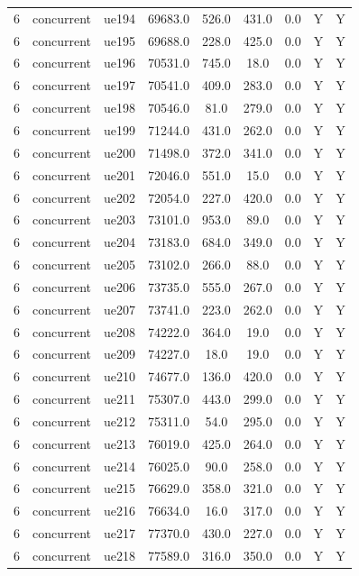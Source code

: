\begin{table}[ht]
\begin{tabular}{|c|c|c|c|c|c|c|c|c|}
6 & concurrent & ue194 & 69683.0 & 526.0 & 431.0 & 0.0 & Y & Y \\
6 & concurrent & ue195 & 69688.0 & 228.0 & 425.0 & 0.0 & Y & Y \\
6 & concurrent & ue196 & 70531.0 & 745.0 & 18.0 & 0.0 & Y & Y \\
6 & concurrent & ue197 & 70541.0 & 409.0 & 283.0 & 0.0 & Y & Y \\
6 & concurrent & ue198 & 70546.0 & 81.0 & 279.0 & 0.0 & Y & Y \\
6 & concurrent & ue199 & 71244.0 & 431.0 & 262.0 & 0.0 & Y & Y \\
6 & concurrent & ue200 & 71498.0 & 372.0 & 341.0 & 0.0 & Y & Y \\
6 & concurrent & ue201 & 72046.0 & 551.0 & 15.0 & 0.0 & Y & Y \\
6 & concurrent & ue202 & 72054.0 & 227.0 & 420.0 & 0.0 & Y & Y \\
6 & concurrent & ue203 & 73101.0 & 953.0 & 89.0 & 0.0 & Y & Y \\
6 & concurrent & ue204 & 73183.0 & 684.0 & 349.0 & 0.0 & Y & Y \\
6 & concurrent & ue205 & 73102.0 & 266.0 & 88.0 & 0.0 & Y & Y \\
6 & concurrent & ue206 & 73735.0 & 555.0 & 267.0 & 0.0 & Y & Y \\
6 & concurrent & ue207 & 73741.0 & 223.0 & 262.0 & 0.0 & Y & Y \\
6 & concurrent & ue208 & 74222.0 & 364.0 & 19.0 & 0.0 & Y & Y \\
6 & concurrent & ue209 & 74227.0 & 18.0 & 19.0 & 0.0 & Y & Y \\
6 & concurrent & ue210 & 74677.0 & 136.0 & 420.0 & 0.0 & Y & Y \\
6 & concurrent & ue211 & 75307.0 & 443.0 & 299.0 & 0.0 & Y & Y \\
6 & concurrent & ue212 & 75311.0 & 54.0 & 295.0 & 0.0 & Y & Y \\
6 & concurrent & ue213 & 76019.0 & 425.0 & 264.0 & 0.0 & Y & Y \\
6 & concurrent & ue214 & 76025.0 & 90.0 & 258.0 & 0.0 & Y & Y \\
6 & concurrent & ue215 & 76629.0 & 358.0 & 321.0 & 0.0 & Y & Y \\
6 & concurrent & ue216 & 76634.0 & 16.0 & 317.0 & 0.0 & Y & Y \\
6 & concurrent & ue217 & 77370.0 & 430.0 & 227.0 & 0.0 & Y & Y \\
6 & concurrent & ue218 & 77589.0 & 316.0 & 350.0 & 0.0 & Y & Y \\

\end{tabular}
\end{table}
